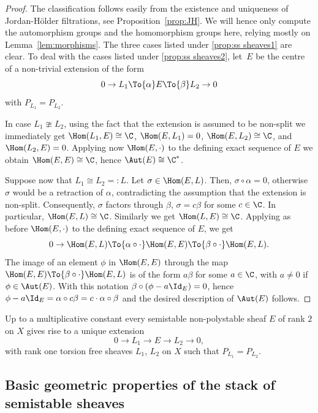 \begin{proof}
The classification follows easily from the existence and uniqueness of Jordan-Hölder filtrations, see Proposition~\ref{prop:JH}. We will hence only compute the automorphism groups and the homomorphism groups here, relying mostly on Lemma~\ref{lem:morphisms}. The three cases listed under \eqref{prop:ss sheaves1} are clear. To deal with the cases listed under \eqref{prop:ss sheaves2}, let~$E$ be the centre of a non-trivial extension of the form
\[
0\to L_1\To{\alpha} E\To{\beta} L_2\to0
\]
with $P_{L_1}=P_{L_2}$.

In case $L_1\ncong L_2$, using the fact that the extension is assumed to be non-split we immediately get $\Hom(L_1,E)\cong\C$, $\Hom(E, L_1)=0$, $\Hom(E,L_2)\cong\C$, and $\Hom(L_2,E)=0$. Applying now $\Hom(E,\cdot)$ to the defining exact sequence of $E$ we obtain $\Hom(E,E)\cong\C$, hence $\Aut(E)\cong\C^*$.

Suppose now that $L_1\cong L_2=:L$. Let $\sigma\in\Hom(E,L)$. Then, $\sigma\circ\alpha=0$, otherwise~$\sigma$ would be a retraction of $\alpha$, contradicting the assumption that the extension is non-split. Consequently, $\sigma$ factors through $\beta$, \ie $\sigma=c\beta$ for some $c\in\C$. In particular, $\Hom(E, L)\cong\C$. Similarly we get $\Hom(L,E)\cong\C$. Applying as before $\Hom(E,\cdot)$ to the defining exact sequence of $E$, we get
\[
0\to\Hom(E,L)\To{\alpha\circ \cdot}\Hom(E, E)\To{\beta\circ\cdot}\Hom(E, L).
\]
The image of an element $\phi$ in $\Hom(E, E)$ through
the map $\Hom(E, E)\To{\beta\circ\cdot}\Hom(E, L)$ is of the form $a\beta$ for some
$a\in\C$, with $a\neq0$ if $\phi\in\Aut(E)$.
With this notation $\beta\circ(\phi-a\Id_E)=0$, hence $\phi-a\Id_E=\alpha\circ c\beta=c\cdot \alpha\circ\beta$ and the desired description of $\Aut(E)$ follows.
\end{proof}

\begin{cor}\label{cor:extensions}
Up to a multiplicative constant every
semistable non-polystable sheaf $E$ of rank $2$ on $X$ gives rise to a unique extension
\[
0\to L_1\to E\to L_2\to 0,
\]
with rank one torsion free sheaves $L_1$, $L_2$ on $X$ such that $P_{L_1}=P_{L_2}$.
\end{cor}

\subsection{Basic geometric properties of the stack of semistable sheaves} \label{subsect:quotient_presentations}

